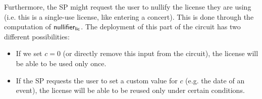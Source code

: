 Furthermore, the SP might request the user to nullify the license they are using (i.e. this is a single-use license, like entering a concert). This is done through the computation of $\mathsf{nullifier_{lic}}$. The deployment of this part of the circuit has two different possibilities:
\begin{itemize}
	\item If we set $c = 0$ (or directly remove this input from the circuit), the license will be able to be used only once.
	\item If the SP requests the user to set a custom value for $c$ (e.g. the date of an event), the license will be able to be reused only under certain conditions.
\end{itemize}
